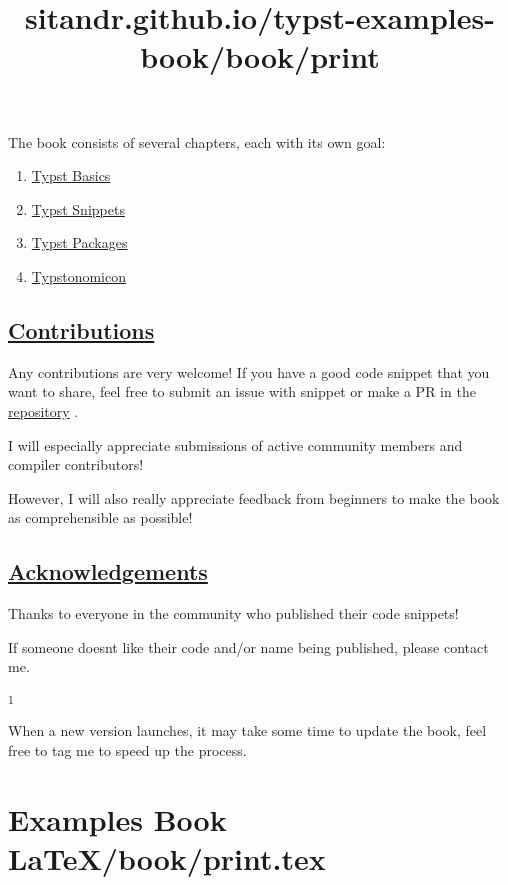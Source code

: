 The book consists of several chapters, each with its own goal:

\begin{enumerate}
\tightlist
\item
  \href{./basics/index.html}{Typst Basics}
\item
  \href{./snippets/index.html}{Typst Snippets}
\item
  \href{./packages/index.html}{Typst Packages}
\item
  \href{./typstonomicon/index.html}{Typstonomicon}
\end{enumerate}

\subsection{\texorpdfstring{\hyperref[contributions]{Contributions}}{Contributions}}\label{contributions}

Any contributions are very welcome! If you have a good code snippet that
you want to share, feel free to submit an issue with snippet or make a
PR in the
\href{https://github.com/sitandr/typst-examples-book}{repository} .

I will especially appreciate submissions of active community members and
compiler contributors!

However, I will also really appreciate feedback from beginners to make
the book as comprehensible as possible!

\subsection{\texorpdfstring{\hyperref[acknowledgements]{Acknowledgements}}{Acknowledgements}}\label{acknowledgements}

Thanks to everyone in the community who published their code snippets!

If someone doesn\textquotesingle t like their code and/or name being
published, please contact me.

\label{1}
\textsuperscript{1}

When a new version launches, it may take some time to update the book,
feel free to tag me to speed up the process.


\section{Examples Book LaTeX/book/print.tex}
\title{sitandr.github.io/typst-examples-book/book/print}

